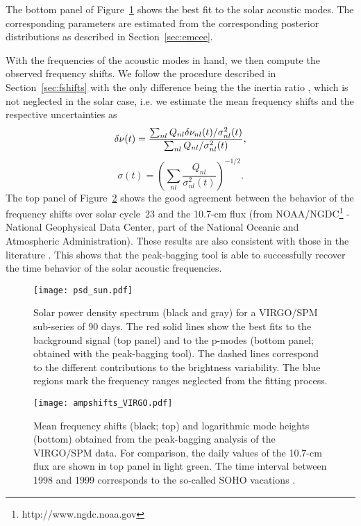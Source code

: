 \documentclass[twocolumn]{aastex61}%
\begin{document}
The bottom panel of Figure~\ref{fig:powersvirgo} shows the best fit to the solar acoustic modes. The corresponding parameters are estimated from the corresponding posterior distributions as described in Section~\ref{sec:emcee}.

With the frequencies of the acoustic modes in hand, we then compute the observed frequency shifts. We follow the procedure described in Section~\ref{sec:fshifts} with the only difference being the the inertia ratio \citep[$Q_{nl}$;][]{Christensen-Dalsgaard1991}, which is not neglected in the solar case, i.e. we estimate the mean frequency shifts and the respective uncertainties as \citep[][]{Chaplin2007,Tripathy2007}\vspace{-0.1cm}
\begin{equation}
\delta\nu(t)=\dfrac{\sum_{nl}Q_{nl}\delta\nu_{nl}(t)/\sigma^2_{nl}(t)}{\sum_{nl}Q_{nl}/\sigma^2_{nl}(t)},\vspace{-0.1cm}
\end{equation}
\begin{equation}
\sigma(t)=\left(\sum_{nl}\dfrac{Q_{nl}}{\sigma_{nl}^2(t)}\right)^{-1/2}.
\end{equation}
The top panel of Figure~\ref{fig:fshiftsvirgo} shows the good agreement between the behavior of the frequency shifts over solar cycle~23 and the 10.7-cm flux (from NOAA/NGDC\footnote{http://www.ngdc.noaa.gov} - National Geophysical Data Center, part of the National Oceanic and Atmospheric Administration). These results are also consistent with those in the literature \citep[e.g.][]{Chaplin2007,Jain2009,Tripathy2007,Tripathy2011}. This shows that the peak-bagging tool is able to successfully recover the time behavior of the solar acoustic frequencies. 

\begin{figure}[h]\centering
\texttt{[image: psd\_sun.pdf]}\vspace{-0.3cm }
\caption{Solar power density spectrum (black and gray) for a VIRGO/SPM sub-series of 90 days. The red solid lines show the best fits to the background signal (top panel) and to the p-modes (bottom panel; obtained with the peak-bagging tool). The dashed lines correspond to the different contributions to the brightness variability. The blue regions mark the frequency ranges neglected from the fitting process.}\label{fig:powersvirgo}\vspace{-.5cm}
\end{figure}

\begin{figure}[h]\centering
\texttt{[image: ampshifts\_VIRGO.pdf]}\vspace{-0.7cm}
\caption{Mean frequency shifts (black; top) and logarithmic mode heights (bottom) obtained from the peak-bagging analysis of the VIRGO/SPM data. For comparison, the daily values of the 10.7-cm flux are shown in top panel in light green. The time interval between 1998 and 1999 corresponds to the so-called SOHO vacations \citep[][]{Appourchaux2005}.}\label{fig:fshiftsvirgo}\vspace{-1.5cm}
\end{figure}
\end{document}
